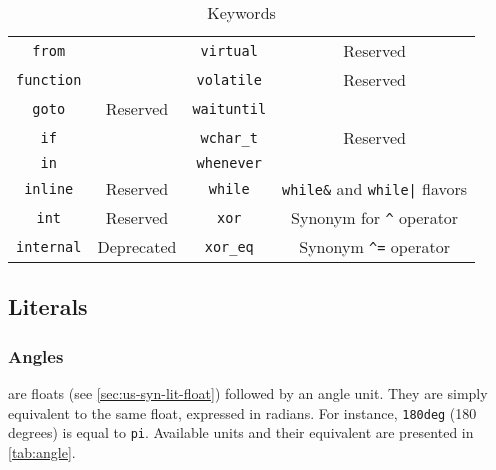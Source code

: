 \begin{table}[\floatpos]
\begin{tabular}{|c|c||c|c|}
    \lstinline"from"              &                                         &
    \lstinline"virtual"           & Reserved                                \\
    \lstinline"function"          &                                         &
    \lstinline"volatile"          & Reserved                                \\
    \lstinline"goto"              & Reserved                                &
    \lstinline"waituntil"         &                                         \\
    \lstinline"if"                &                                         &
    \lstinline"wchar_t"           & Reserved                                \\
    \lstinline"in"                &                                         &
    \lstinline"whenever"          &                                         \\
    \lstinline"inline"            & Reserved                                &
    \lstinline"while"             & \lstinline|while&| and
                                    \lstinline-while|- flavors              \\
    \lstinline"int"               & Reserved                                &
    \lstinline"xor"               & Synonym for \lstinline|^| operator      \\
    \lstinline"internal"          & Deprecated                              &
    \lstinline"xor_eq"            & Synonym \lstinline|^=| operator         \\
    \hline
  \end{tabular}
  \caption{Keywords}
  \label{tab:keywords}
\end{table}
\renewcommand{\baselinestretch}{1}

\subsection{Literals}

\subsubsection{Angles}

 are floats (see \autoref{sec:us-syn-lit-float})
followed by an angle unit. They are simply equivalent to the same
float, expressed in radians. For instance, \lstinline|180deg| (180
degrees) is equal to \lstinline|pi|. Available units and their
equivalent are presented in \autoref{tab:angle}.

